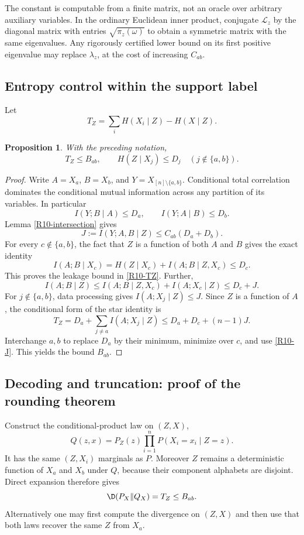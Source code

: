 \documentclass[11pt,a4paper]{article}
\newtheorem{proposition}[theorem]{Proposition}
\theoremstyle{definition}\newtheorem{definition}[theorem]{Definition}
\theoremstyle{remark}\newtheorem{remark}[theorem]{Remark}
\numberwithin{equation}{section}
\begin{document}
The constant is computable from a finite matrix, not an oracle over arbitrary auxiliary variables. In the ordinary Euclidean inner product, conjugate $\mathcal L_z$ by the diagonal matrix with entries $\sqrt{\pi_z(\omega)}$ to obtain a symmetric matrix with the same eigenvalues. Any rigorously certified lower bound on its first positive eigenvalue may replace $\lambda_z$, at the cost of increasing $C_{ab}$.

\subsection{Entropy control within the support label}\label{R10-sec-3}
Let
\[
 T_Z=\sum_iH(X_i\mid Z)-H(X\mid Z).
\]
\begin{proposition}\label{R10-control}
With the preceding notation,
\begin{equation}\label{R10-TZ}
 T_Z\le B_{ab},\qquad H(Z\mid X_j)\le D_j\quad(j\notin\{a,b\}).
\end{equation}
\end{proposition}
\begin{proof}
Write $A=X_a$, $B=X_b$, and $Y=X_{[n]\setminus\{a,b\}}$. Conditional total correlation dominates the conditional mutual information across any partition of its variables. In particular
\[
 I(Y;B\mid A)\le D_a,\qquad I(Y;A\mid B)\le D_b.
\]
Lemma \ref{R10-intersection} gives
\begin{equation}\label{R10-J}
 J:=I(Y;A,B\mid Z)\le C_{ab}(D_a+D_b).
\end{equation}
For every $c\notin\{a,b\}$, the fact that $Z$ is a function of both $A$ and $B$ gives the exact identity
\[
 I(A;B\mid X_c)=H(Z\mid X_c)+I(A;B\mid Z,X_c)\le D_c.
\]
This proves the leakage bound in \eqref{R10-TZ}. Further,
\[
 I(A;B\mid Z)\le I(A;B\mid Z,X_c)+I(A;X_c\mid Z)\le D_c+J.
\]
For $j\notin\{a,b\}$, data processing gives $I(A;X_j\mid Z)\le J$. Since $Z$ is a function of $A$, the conditional form of the star identity is
\[
 T_Z=D_a+\sum_{j\ne a}I(A;X_j\mid Z)
 \le D_a+D_c+(n-1)J.
\]
Interchange $a,b$ to replace $D_a$ by their minimum, minimize over $c$, and use \eqref{R10-J}. This yields the bound $B_{ab}$.
\end{proof}

\subsection{Decoding and truncation: proof of the rounding theorem}\label{R10-sec-4}
Construct the conditional-product law on $(Z,X)$,
\begin{equation}\label{R10-Q}
 Q(z,x)=P_Z(z)\prod_{i=1}^nP(X_i=x_i\mid Z=z).
\end{equation}
It has the same $(Z,X_i)$ marginals as $P$. Moreover $Z$ remains a deterministic function of $X_a$ and $X_b$ under $Q$, because their component alphabets are disjoint. Direct expansion therefore gives
\begin{equation}\label{R10-KLQ}
 \D(P_X\Vert Q_X)=T_Z\le B_{ab}.
\end{equation}
Alternatively one may first compute the divergence on $(Z,X)$ and then use that both laws recover the same $Z$ from $X_a$.
\end{document}
